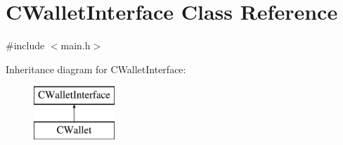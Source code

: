 \hypertarget{class_c_wallet_interface}{}\section{C\+Wallet\+Interface Class Reference}
\label{class_c_wallet_interface}


{\ttfamily \#include $<$main.\+h$>$}

Inheritance diagram for C\+Wallet\+Interface\+:\begin{figure}[H]
\begin{center}
\leavevmode
\includegraphics[height=2.000000cm]{class_c_wallet_interface}
\end{center}
\end{figure}
